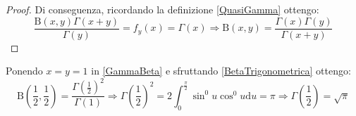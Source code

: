 \begin{proof}
	Di conseguenza, ricordando la definizione \cref{QuasiGamma} ottengo:
	\begin{equation*}
		\frac{\mathrm{B}(x,y)\Gamma(x+y)}{\Gamma(y)}=f_y(x)=\Gamma(x) \Longrightarrow \mathrm{B}(x,y)=\frac{\Gamma(x)\Gamma(y)}{\Gamma(x+y)}
	\end{equation*}
\end{proof}

\begin{remark}
	Ponendo $x=y=1$ in \cref{GammaBeta} e sfruttando \cref{BetaTrigonometrica} ottengo:
	\begin{equation*}
		\mathrm{B}\left(\frac12,\frac12\right)=\dfrac{\Gamma\left(\frac12\right)^2}{\Gamma(1)}\Rightarrow 
		\Gamma\left(\frac12\right)^2=2\int_0^{\frac{\pi}2}\sin^0u\cos^0u\mathrm{d}u=\pi\Rightarrow \Gamma\left(\frac12\right)=\sqrt{\pi}
	\end{equation*}
\end{remark}